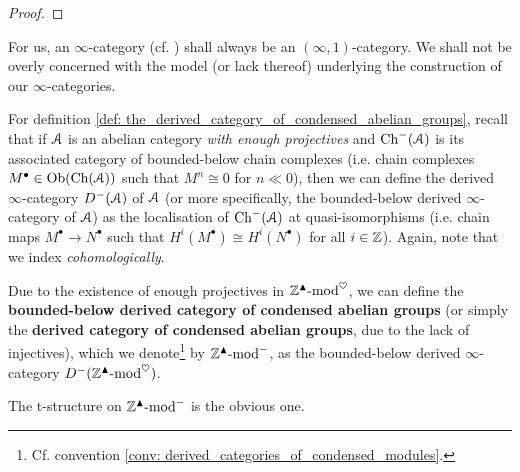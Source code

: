                 \begin{proof}
                    
                \end{proof}
            \begin{convention}
                For us, an $\infty$-category (cf. \cite[Chapters 1-3]{HTT}) shall always be an $(\infty, 1)$-category. We shall not be overly concerned with the model (or lack thereof) underlying the construction of our $\infty$-categories. 
            \end{convention}
            \begin{remark}
                For definition \ref{def: the_derived_category_of_condensed_abelian_groups}, recall that if $\mathcal{A}$ is an abelian category \textit{with enough projectives} and $\mathrm{Ch}^-(\mathcal{A})$ is its associated category of bounded-below chain complexes (i.e. chain complexes $M^{\bullet} \in \mathrm{Ob}(\mathrm{Ch}(\mathcal{A}))$ such that $M^n \cong 0$ for $n \ll 0$), then we can define the derived $\infty$-category $D^-(\mathcal{A})$ of $\mathcal{A}$ (or more specifically, the bounded-below derived $\infty$-category of $\mathcal{A}$) as the localisation of $\mathrm{Ch}^-(\mathcal{A})$ at quasi-isomorphisms (i.e. chain maps $M^{\bullet} \to N^{\bullet}$ such that $H^i(M^{\bullet}) \cong H^i(N^{\bullet})$ for all $i \in \mathbb{Z}$). Again, note that we index \textit{cohomologically}. 
            \end{remark}
            \begin{definition} \label{def: the_derived_category_of_condensed_abelian_groups}
                Due to the existence of enough projectives in $\mathbb{Z}^{\blacktriangle}\text{-}\mathrm{mod}^{\heartsuit}$, we can define the \textbf{bounded-below derived category of condensed abelian groups} (or simply the \textbf{derived category of condensed abelian groups}, due to the lack of injectives), which we denote\footnote{Cf. convention \ref{conv: derived_categories_of_condensed_modules}.} by $\mathbb{Z}^{\blacktriangle}\text{-}\mathrm{mod}^-$, as the bounded-below derived $\infty$-category $D^-(\mathbb{Z}^{\blacktriangle}\text{-}\mathrm{mod}^{\heartsuit})$.
                
                The t-structure on $\mathbb{Z}^{\blacktriangle}\text{-}\mathrm{mod}^-$ is the obvious one.
            \end{definition}
